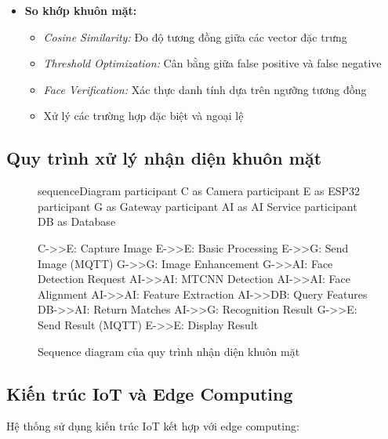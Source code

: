 \begin{itemize}
    \item \textbf{So khớp khuôn mặt:}
    \begin{itemize}
        \item \textit{Cosine Similarity:} Đo độ tương đồng giữa các vector đặc trưng
        \item \textit{Threshold Optimization:} Cân bằng giữa false positive và false negative
        \item \textit{Face Verification:} Xác thực danh tính dựa trên ngưỡng tương đồng
        \item Xử lý các trường hợp đặc biệt và ngoại lệ
    \end{itemize}
\end{itemize}

\subsection{Quy trình xử lý nhận diện khuôn mặt}
\begin{figure}[h]
\begin{mermaid}
sequenceDiagram
    participant C as Camera
    participant E as ESP32
    participant G as Gateway
    participant AI as AI Service
    participant DB as Database
    
    C->>E: Capture Image
    E->>E: Basic Processing
    E->>G: Send Image (MQTT)
    G->>G: Image Enhancement
    G->>AI: Face Detection Request
    AI->>AI: MTCNN Detection
    AI->>AI: Face Alignment
    AI->>AI: Feature Extraction
    AI->>DB: Query Features
    DB->>AI: Return Matches
    AI->>G: Recognition Result
    G->>E: Send Result (MQTT)
    E->>E: Display Result
\end{mermaid}
\caption{Sequence diagram của quy trình nhận diện khuôn mặt}
\end{figure}

\subsection{Kiến trúc IoT và Edge Computing}
\hspace{0.5cm}Hệ thống sử dụng kiến trúc IoT kết hợp với edge computing:

